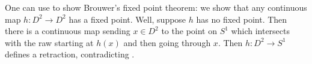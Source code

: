 \documentclass[../notes.tex]{subfiles}
\begin{document}
\begin{remark}
	One can use  to show Brouwer's fixed point theorem: we show that any continuous map $h\colon D^2\to D^2$ has a fixed point. Well, suppose $h$ has no fixed point. Then there is a continuous map sending $x\in D^2$ to the point on $S^1$ which intersects with the raw starting at $h(x)$ and then going through $x$. Then $h\colon D^2\to S^1$ defines a retraction, contradicting .
\end{remark}
\end{document}
